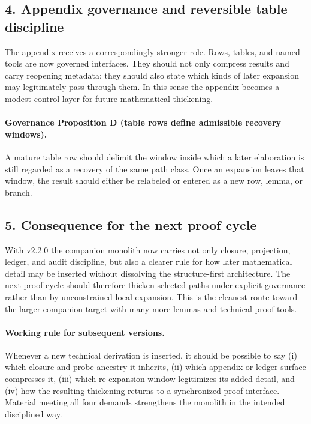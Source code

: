 \subsection*{4. Appendix governance and reversible table discipline}
The appendix receives a correspondingly stronger role. Rows, tables, and named
tools are now governed interfaces. They should not only compress results and
carry reopening metadata; they should also state which kinds of later expansion
may legitimately pass through them. In this sense the appendix becomes a modest
control layer for future mathematical thickening.

\paragraph{Governance Proposition D (table rows define admissible recovery windows).}
A mature table row should delimit the window inside which a later elaboration is
still regarded as a recovery of the same path class. Once an expansion leaves
that window, the result should either be relabeled or entered as a new row,
lemma, or branch.

\subsection*{5. Consequence for the next proof cycle}
With v2.2.0 the companion monolith now carries not only closure,
projection, ledger, and audit discipline, but also a clearer rule for how later
mathematical detail may be inserted without dissolving the structure-first
architecture. The next proof cycle should therefore thicken selected paths under
explicit governance rather than by unconstrained local expansion. This is the
cleanest route toward the larger companion target with many more lemmas and
technical proof tools.

\paragraph{Working rule for subsequent versions.}
Whenever a new technical derivation is inserted, it should be possible to say
(i) which closure and probe ancestry it inherits, (ii) which appendix or ledger
surface compresses it, (iii) which re-expansion window legitimizes its added
detail, and (iv) how the resulting thickening returns to a synchronized proof
interface. Material meeting all four demands strengthens the monolith in the
intended disciplined way.


\clearpage
